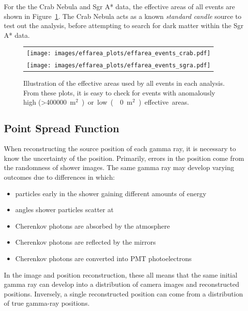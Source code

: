 For the the Crab Nebula and Sgr A* data, the effective areas of all events are shown in Figure~\ref{fig:effarea_usage}.
The Crab Nebula acts as a known \textit{standard candle} source to test out the analysis, before attempting to search for dark matter within the Sgr A* data.
    
    \begin{figure}[!t]
      \centering
      \begin{tabular}{c}
        \texttt{[image: images/effarea\_plots/effarea\_events\_crab.pdf]} \\
        \texttt{[image: images/effarea\_plots/effarea\_events\_sgra.pdf]}
      \end{tabular}
      \caption[Effective Areas Used]{
      Illustration of the effective areas used by all events in each analysis.
      From these plots, it is easy to check for events with anomalously high (>\SI{400000}{m${}^2$}) or low (\nicetilde\SI{0}{m${}^2$}) effective areas.
      }
      \label{fig:effarea_usage}
    \end{figure}
  
  \FloatBarrier

  \subsection{Point Spread Function}\label{subsec:psf}

    When reconstructing the source position of each gamma ray, it is necessary to know the uncertainty of the position.
    Primarily, errors in the position come from the randomness of shower images.
    The same gamma ray may develop varying outcomes due to differences in which:
    \begin{itemize}[label=$\bullet$,noitemsep]
      \item particles early in the shower gaining different amounts of energy
      \item angles shower particles scatter at
      \item Cherenkov photons are absorbed by the atmosphere
      \item Cherenkov photons are reflected by the mirrors
      \item Cherenkov photons are converted into PMT photoelectrons
    \end{itemize}
    In the image and position reconstruction, these all means that the same initial gamma ray can develop into a distribution of camera images and reconstructed positions.
    Inversely, a single reconstructed position can come from a distribution of true gamma-ray positions.

